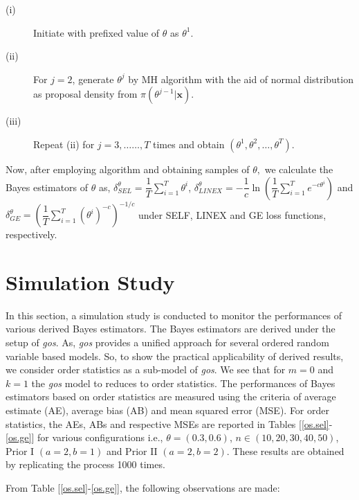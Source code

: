 \documentclass[11pt,a4paper]{article}
\numberwithin{equation}{section}
\begin{document}
	\begin{description}

		\item[(i)] Initiate with prefixed value of $\theta$ as $\theta^{1}.$

		\item[(ii)] For $j=2$, generate $\theta^{j}$ by MH algorithm with the aid of normal distribution as proposal density from $\pi(\theta^{j-1}|\boldsymbol{x})$.

		\item[(iii)] Repeat (ii) for $j=3,\ldots \ldots,T$ times and obtain $(\theta^1,\theta^2,\ldots,\theta^T).$

	\end{description}

	Now, after employing algorithm and obtaining samples of $\theta,$ we calculate the Bayes estimators of $\theta$ as, $\delta^\theta_{SEL}=\dfrac{1}{T}\sum_{i=1}^{T}\theta^i$, $\delta^\theta_{LINEX}=-\dfrac{1}{c} \ln \left(\dfrac{1}{T}\sum_{i=1}^{T}e^{-c\theta^i}\right)$ and $\delta^\theta_{GE}=\left(\dfrac{1}{T}\sum_{i=1}^{T}(\theta^i)^{-c}\right)^{-1/c}$ under SELF, LINEX and GE loss functions, respectively.

	

	\section{Simulation Study}\label{sec:simu}

	In this section, a simulation study is conducted to monitor the performances of various derived Bayes estimators. The Bayes estimators are derived under the setup of \textit{gos}. As, \textit{gos} provides a unified approach for several ordered random variable based models. So, to show the practical applicability of derived results, we consider order statistics as a sub-model of \textit{gos}. We see that for $m=0$ and $k=1$ the \textit{gos} model to reduces to order statistics. The performances of Bayes estimators based on order statistics are measured using the criteria of average estimate (AE), average bias (AB) and mean squared error (MSE). For order statistics, the AEs, ABs and respective MSEs are reported in Tables [\ref{os.sel}-\ref{os.ge}] for various configurations i.e., $\theta=(0.3,0.6)$, $n\in(10,20,30,40,50)$, Prior I $(a=2,b=1)$ and Prior II $(a=2,b=2)$. These results are obtained by replicating the process 1000 times.

	From Table [\ref{os.sel}-\ref{os.ge}], the following observations are made:
\end{document}
